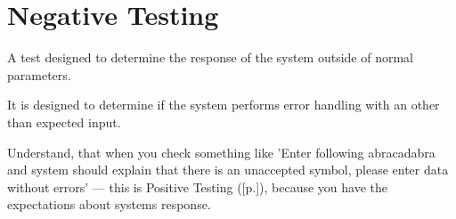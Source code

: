 \section{Negative Testing}
\label{sec:Negative Testing}

A test designed to determine the response of the system outside of normal parameters.

It is designed to determine if the system performs error handling with an other than expected input.

Understand, that when you check something like 'Enter following abracadabra and system should explain that there is an unaccepted symbol, please enter data without errors' — this is Positive Testing ([p.\pageref{sec:Positive Testing}]), because you have the expectations about systems response.